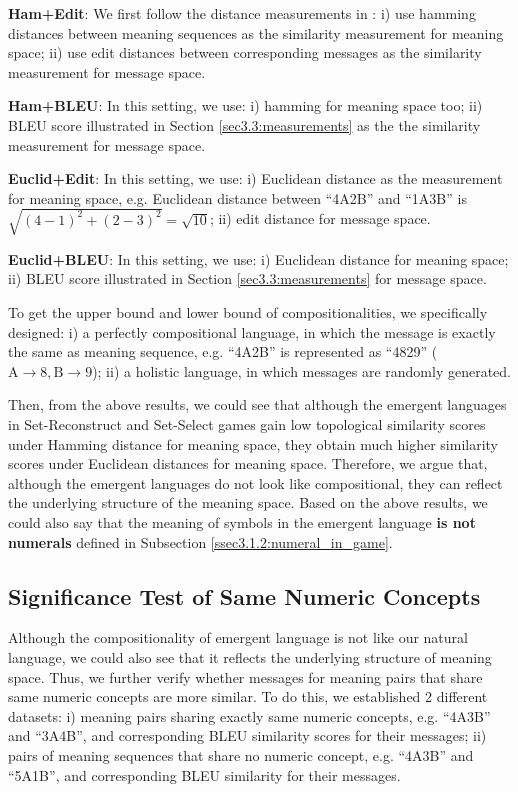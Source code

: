 \noindent\textbf{Ham+Edit}: We first follow the distance measurements in \cite{brighton2006understanding}: i) use hamming distances between meaning sequences as the similarity measurement for meaning space; ii) use edit distances between corresponding messages as the similarity measurement for message space.

\noindent\textbf{Ham+BLEU}: In this setting, we use: i) hamming for meaning space too; ii) BLEU score illustrated in Section \ref{sec3.3:measurements} as the the similarity measurement for message space.

\noindent\textbf{Euclid+Edit}: In this setting, we use: i) Euclidean distance as the measurement for meaning space, e.g. Euclidean distance between ``4A2B'' and ``1A3B'' is \\ $\sqrt{(4-1)^2 + (2-3)^2}=\sqrt{10}$; ii) edit distance for message space.

\noindent\textbf{Euclid+BLEU}: In this setting, we use: i) Euclidean distance for meaning space; ii) BLEU score illustrated in Section \ref{sec3.3:measurements} for message space.

To get the upper bound and lower bound of compositionalities, we specifically designed: i) a perfectly compositional language, in which the message is exactly the same as meaning sequence, e.g. ``4A2B'' is represented as ``4829'' ($\mbox{A}\rightarrow 8, \mbox{B} \rightarrow 9$); ii) a holistic language, in which messages are randomly generated.

Then, from the above results, we could see that although the emergent languages in Set-Reconstruct and Set-Select games gain low topological similarity scores under Hamming distance for meaning space, they obtain much higher similarity scores under Euclidean distances for meaning space. Therefore, we argue that, although the emergent languages do not look like compositional, they can reflect the underlying structure of the meaning space. Based on the above results, we could also say that the meaning of symbols in the emergent language \textbf{is not numerals} defined in Subsection \ref{ssec3.1.2:numeral_in_game}. 

\subsection{Significance Test of Same Numeric Concepts}
\label{ssec4.2.3:significance_test}

Although the compositionality of emergent language is not like our natural language, we could also see that it reflects the underlying structure of meaning space. Thus, we further verify whether messages for meaning pairs that share same numeric concepts are more similar. To do this, we established 2 different datasets: i) meaning pairs sharing exactly same numeric concepts, e.g. ``4A3B'' and ``3A4B'', and corresponding BLEU similarity scores for their messages; ii) pairs of meaning sequences that share no numeric concept, e.g. ``4A3B'' and ``5A1B'', and corresponding BLEU similarity for their messages.


